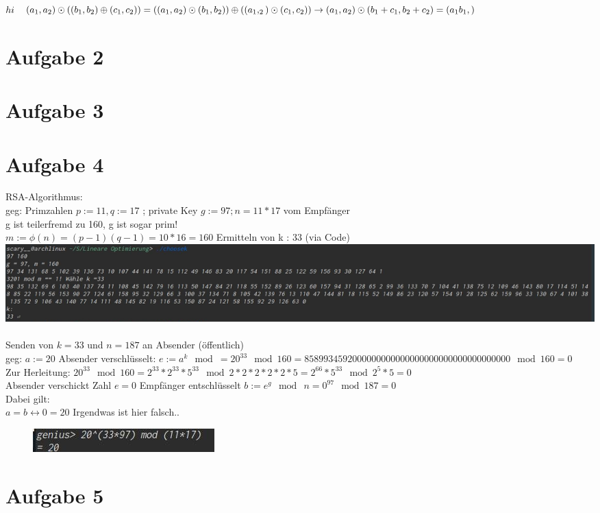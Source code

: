 \documentclass[]{article}
\begin{document}
 
 
 
 
 
 
 
 
 
 
 
 
 
 
 
 
 
 
 
 
 
 $hi\\$
 $ (a_1,a_2) \odot ( (b_1,b_2) \oplus (c_1,c_2) ) =  ((a_1,a_2) \odot  (b_1,b_2)  ) \oplus ( (a_1,_2) \odot(c_1,c_2) )\\
\rightarrow (a_1,a_2) \odot (b_1+c_1,b_2+c_2) = (a_1b_1, )
 $
                                

\section*{Aufgabe 2}
\section*{Aufgabe 3}
\section*{Aufgabe 4}
RSA-Algorithmus:\\
geg: Primzahlen $p:=11, q :=17$ ;  private Key $g :=97 ; n = 11*17$ vom Empfänger \\ g ist teilerfremd zu 160, g ist sogar prim! \\
$m:= \phi(n) = (p-1)(q-1)= 10*16=160 $
Ermitteln von k : 33 (via Code)\\
\includegraphics[width=\textwidth,clip,trim=0 0 {500} 0, ]{k.jpg} \\
\\
Senden von $k=33$ und $n= 187$ an Absender (öffentlich)\\
geg: $a:=20$
Absender verschlüsselt:  $e:= a^k \mod=20^{33}\mod 160=8589934592000000000000000000000000000000000 \mod 160=0 $\\
Zur Herleitung: $20^{33} \mod 160 = 2^{33}*2^{33}*5^{33} \mod 2*2*2*2*2*5=2^{66}*5^{33}\mod 2^5*5 = 0$ \\
Absender verschickt Zahl $e=0$
Empfänger entschlüsselt $b:= e^g \mod \ n = 0^{97} \mod 187 = 0  $\\  Dabei gilt: \\
$a = b \leftrightarrow 0=20  $  Irgendwas ist hier falsch..  

	\begin{figure}[!h]
\centering
	\includegraphics[width=0.7\linewidth]{"prove.jpg"}
	
	\label{fig:screenshot-from-2019-11-30-17-46-06}
	
\end{figure}


\section*{Aufgabe 5}
\end{document}
